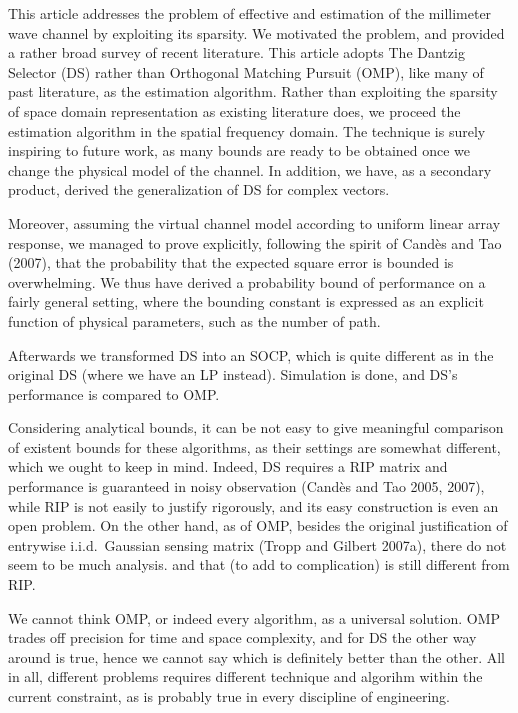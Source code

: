 
\startchapter [title={Conclusion}]

This article addresses the problem of effective and estimation of the millimeter wave channel by exploiting its sparsity.
We motivated the problem, and provided a rather broad survey of recent literature.
This article adopts The Dantzig Selector (DS) rather than Orthogonal Matching Pursuit (OMP), like many of past literature, as the estimation algorithm.
Rather than exploiting the sparsity of space domain representation as existing literature does, we proceed the estimation algorithm in the spatial frequency domain.
The technique is surely inspiring to future work, as many bounds are ready to be obtained once we change the physical model of the channel.
In addition, we have, as a secondary product, derived the generalization of DS for complex vectors.

Moreover, assuming the virtual channel model according to uniform linear array response, we managed to prove explicitly, following the spirit of Cand\`es and Tao (2007), that the probability that the expected square error is bounded is overwhelming.
We thus have derived a probability bound of performance on a fairly general setting, where the bounding constant is expressed as an explicit function of physical parameters, such as the number of path.

Afterwards we transformed DS into an SOCP, which is quite different as in the original DS (where we have an LP instead).
Simulation is done, and DS's performance is compared to OMP.
\color[red]{(To be done)}

Considering analytical bounds, it can be not easy to give meaningful comparison of existent bounds for these algorithms, as their settings are somewhat different, which we ought to keep in mind.
Indeed, DS requires a RIP matrix and performance is guaranteed in noisy observation (Cand\`es and Tao 2005, 2007), while RIP is not easily to justify rigorously, and its easy construction is even an open problem.
On the other hand, as of OMP, besides the original justification of entrywise i.i.d.\ Gaussian sensing matrix (Tropp and Gilbert 2007a), there do not seem to be much analysis.
and that (to add to complication) is still different from RIP.


We cannot think OMP, or indeed every algorithm, as a universal solution.
OMP trades off precision for time and space complexity, and for DS the other way around is true, hence we cannot say which is definitely better than the other.
All in all, different problems requires different technique and algorihm within the current constraint, as is probably true in every discipline of engineering.

\stopchapter


